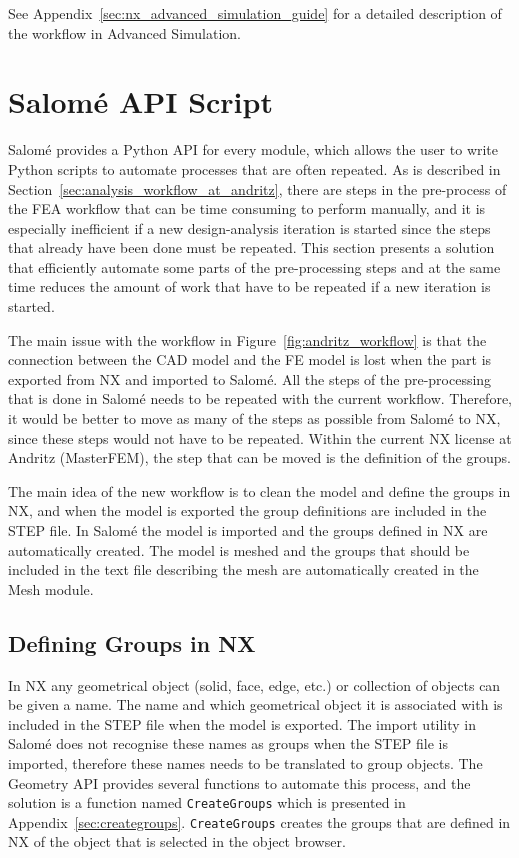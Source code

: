 See Appendix~\ref{sec:nx_advanced_simulation_guide} for a detailed description of the workflow in Advanced Simulation. 


\section{Salomé API Script} %
\label{sec:salom_api_script}
Salomé provides a Python API for every module, which allows the user to write Python scripts to automate processes that are often repeated. As is described in Section~\ref{sec:analysis_workflow_at_andritz}, there are steps in the pre-process of the FEA workflow that can be time consuming to perform manually, and it is especially inefficient if a new design-analysis iteration is started since the steps that already have been done must be repeated. This section presents a solution that efficiently automate some parts of the pre-processing steps and at the same time reduces the amount of work that have to be repeated if a new iteration is started.

The main issue with the workflow in Figure~\ref{fig:andritz_workflow} is that the connection between the CAD model and the FE model is lost when the part is exported from NX and imported to Salomé. All the steps of the pre-processing that is done in Salomé needs to be repeated with the current workflow. Therefore, it would be better to move as many of the steps as possible from Salomé to NX, since these steps would not have to be repeated. Within the current NX license at Andritz (MasterFEM), the step that can be moved is the definition of the groups.

The main idea of the new workflow is to clean the model and define the groups in NX, and when the model is exported the group definitions are included in the STEP file. In Salomé the model is imported and the groups defined in NX are automatically created. The model is meshed and the groups that should be included in the text file describing the mesh are automatically created in the Mesh module.

\subsection{Defining Groups in NX} %
\label{sub:defining_groups_in_nx}
In NX any geometrical object (solid, face, edge, etc.) or collection of objects can be given a name. The name and which geometrical object it is associated with is included in the STEP file when the model is exported. The import utility in Salomé does not recognise these names as groups when the STEP file is imported, therefore these names needs to be translated to group objects. The Geometry API provides several functions to automate this process, and the solution is a function named \texttt{CreateGroups} which is presented in Appendix~\ref{sec:creategroups}. \texttt{CreateGroups} creates the groups that are defined in NX of the object that is selected in the object browser.

